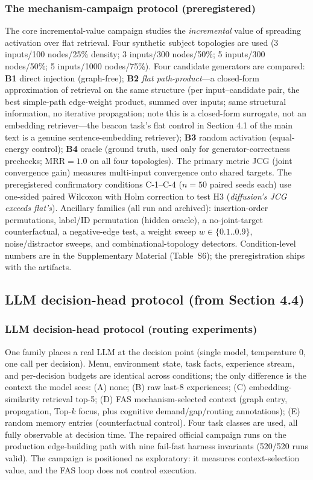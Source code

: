 \documentclass[10pt]{article}
\begin{document}
\subsubsection{The mechanism-campaign protocol (preregistered)}
The core incremental-value campaign studies the \emph{incremental} value of spreading activation over flat retrieval. Four synthetic subject topologies are used (3 inputs/100 nodes/25\% density; 3 inputs/300 nodes/50\%; 5 inputs/300 nodes/50\%; 5 inputs/1000 nodes/75\%). Four candidate generators are compared: \textbf{B1} direct injection (graph-free); \textbf{B2} \emph{flat path-product}---a closed-form approximation of retrieval on the same structure (per input--candidate pair, the best simple-path edge-weight product, summed over inputs; same structural information, no iterative propagation; note this is a closed-form surrogate, not an embedding retriever---the beacon task's flat control in Section 4.1 of the main text is a genuine sentence-embedding retriever); \textbf{B3} random activation (equal-energy control); \textbf{B4} oracle (ground truth, used only for generator-correctness prechecks; MRR${=}1.0$ on all four topologies). The primary metric JCG (joint convergence gain) measures multi-input convergence onto shared targets. The preregistered confirmatory conditions C-1--C-4 ($n{=}50$ paired seeds each) use one-sided paired Wilcoxon with Holm correction to test H3 (\emph{diffusion's JCG exceeds flat's}). Ancillary families (all run and archived): insertion-order permutations, label/ID permutation (hidden oracle), a no-joint-target counterfactual, a negative-edge test, a weight sweep $w\in\{0.1..0.9\}$, noise/distractor sweeps, and combinational-topology detectors. Condition-level numbers are in the Supplementary Material (Table~S6); the preregistration ships with the artifacts.


\subsection{LLM decision-head protocol (from Section 4.4)}
\subsubsection{LLM decision-head protocol (routing experiments)}
One family places a real LLM at the decision point (single model, temperature 0, one call per decision). Menu, environment state, task facts, experience stream, and per-decision budgets are identical across conditions; the only difference is the context the model sees: (A) none; (B) raw last-8 experiences; (C) embedding-similarity retrieval top-5; (D) FAS mechanism-selected context (graph entry, propagation, Top-$k$ focus, plus cognitive demand/gap/routing annotations); (E) random memory entries (counterfactual control). Four task classes are used, all fully observable at decision time. The repaired official campaign runs on the production edge-building path with nine fail-fast harness invariants (520/520 runs valid). The campaign is positioned as exploratory: it measures context-selection value, and the FAS loop does not control execution.
\end{document}
